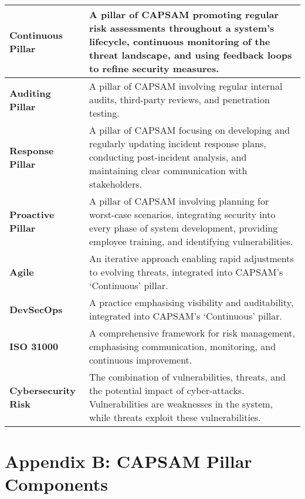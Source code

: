 \begin{longtable}{|m{4cm}|m{10cm}|}
    \textbf{Continuous Pillar} & A pillar of CAPSAM promoting regular risk assessments throughout a system's lifecycle, continuous monitoring of the threat landscape, and using feedback loops to refine security measures. \\ \hline
    \textbf{Auditing Pillar} & A pillar of CAPSAM involving regular internal audits, third-party reviews, and penetration testing. \\ \hline
    \textbf{Response Pillar} & A pillar of CAPSAM focusing on developing and regularly updating incident response plans, conducting post-incident analysis, and maintaining clear communication with stakeholders. \\ \hline
    \textbf{Proactive Pillar} & A pillar of CAPSAM involving planning for worst-case scenarios, integrating security into every phase of system development, providing employee training, and identifying vulnerabilities. \\ \hline
    \textbf{Agile} & An iterative approach enabling rapid adjustments to evolving threats, integrated into CAPSAM's `Continuous' pillar. \\ \hline
    \textbf{DevSecOps} & A practice emphasising visibility and auditability, integrated into CAPSAM's `Continuous' pillar. \\ \hline
    \textbf{ISO 31000} & A comprehensive framework for risk management, emphasising communication, monitoring, and continuous improvement. \\ \hline
    \textbf{Cybersecurity Risk} & The combination of vulnerabilities, threats, and the potential impact of cyber-attacks. Vulnerabilities are weaknesses in the system, while threats exploit these vulnerabilities. \\ 
\end{longtable}

\newpage

\section*{Appendix B: CAPSAM Pillar Components}

